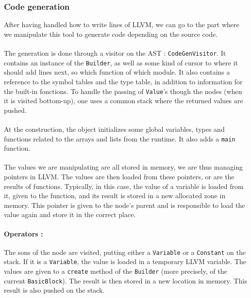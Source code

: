 \documentclass[a4paper,11pt]{article}
\begin{document}
	\subsubsection{Code generation}

After having handled how to write lines of LLVM, we can go to the part where we manipulate this tool to generate code depending on the source code.

\paragraph{}

The generation is done through a visitor on the AST : \texttt{CodeGenVisitor}. It contains an instance of the \texttt{Builder}, as well as some kind of cursor to where it should add lines next, so which function of which module. It also contains a reference to the symbol tables and the type table, in addition to information for the built-in fonctions. To handle the passing of \texttt{Value}'s though the nodes (when it is visited bottom-up), one uses a common stack where the returned values are pushed. 

\paragraph{}

At the construction, the object initializes some global variables, types and functions related to the arrays and lists from the runtime. It also adds a \texttt{main} function.

\paragraph{}

The values we are manipulating are all stored in memory, we are thus managing pointers in LLVM. The values are then loaded from these pointers, or are the results of functions. Typically, in this case, the value of a variable is loaded from it, given to the function, and its result is stored in a new allocated zone in memory. This pointer is given to the node's parent and is responsible to load the value again and store it in the correct place.

\paragraph{Operators :} The sons of the node are visited, putting either a \texttt{Variable} or a \texttt{Constant} on the stack. If it is a \texttt{Variable}, the value is loaded in a temporary LLVM variable. The values are given to a \texttt{create} method of the \texttt{Builder} (more precisely, of the current \texttt{BasicBlock}). The result is then stored in a new location in memory. This result is also pushed on the stack.
\end{document}
